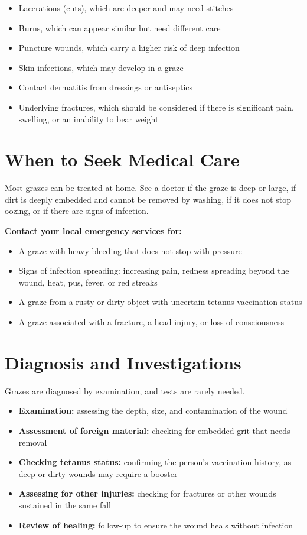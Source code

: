 \begin{itemize}
    \item Lacerations (cuts), which are deeper and may need stitches
    \item Burns, which can appear similar but need different care
    \item Puncture wounds, which carry a higher risk of deep infection
    \item Skin infections, which may develop in a graze
    \item Contact dermatitis from dressings or antiseptics
    \item Underlying fractures, which should be considered if there is significant pain, swelling, or an inability to bear weight
\end{itemize}

\section*{When to Seek Medical Care}
Most grazes can be treated at home. See a doctor if the graze is deep or large, if dirt is deeply embedded and cannot be removed by washing, if it does not stop oozing, or if there are signs of infection.

\textbf{Contact your local emergency services for:}
\begin{itemize}
    \item A graze with heavy bleeding that does not stop with pressure
    \item Signs of infection spreading: increasing pain, redness spreading beyond the wound, heat, pus, fever, or red streaks
    \item A graze from a rusty or dirty object with uncertain tetanus vaccination status
    \item A graze associated with a fracture, a head injury, or loss of consciousness
\end{itemize}

\section*{Diagnosis and Investigations}
Grazes are diagnosed by examination, and tests are rarely needed.

\begin{itemize}
    \item \textbf{Examination:} assessing the depth, size, and contamination of the wound
    \item \textbf{Assessment of foreign material:} checking for embedded grit that needs removal
    \item \textbf{Checking tetanus status:} confirming the person's vaccination history, as deep or dirty wounds may require a booster
    \item \textbf{Assessing for other injuries:} checking for fractures or other wounds sustained in the same fall
    \item \textbf{Review of healing:} follow-up to ensure the wound heals without infection
\end{itemize}

